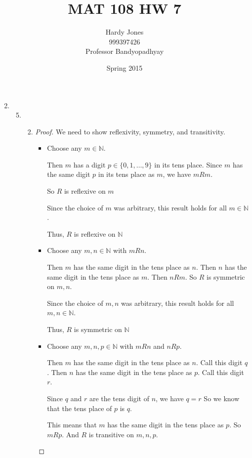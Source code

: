\documentclass[12pt,letterpaper]{article}
\title{MAT 108 HW 7\vspace{-2ex}}
\author{Hardy Jones\\
        999397426\\
        Professor Bandyopadhyay\vspace{-2ex}}
\date{Spring 2015}
\newcommand*\reflexive[4]{%
  Choose any $#3 \in \mathbb{#1}$.

  #4

  So $#2$ is reflexive on $#3$

  Since the choice of $#3$ was arbitrary,
  this result holds for all $#3 \in \mathbb{#1}$.

  Thus, $#2$ is reflexive on $\mathbb{#1}$
}
\begin{document}
  \maketitle

  \begin{enumerate}
    \setcounter{enumi}{1}
    \item
      \begin{enumerate}
        \setcounter{enumii}{4}
        \item
          \begin{enumerate}
            \setcounter{enumiii}{1}
            \item
              \begin{proof}
                We need to show reflexivity, symmetry, and transitivity.

                \begin{itemize}
                  \item
                    \reflexive{N}{R}{m}{
                      Then $m$ has a digit $p \in \{0, 1, \dots, 9\}$ in its tens place.
                      Since $m$ has the same digit $p$ in its tens place as $m$,
                      we have $m R m$.
                    }
                  \item
                    Choose any $m, n \in \mathbb{N}$ with $m R n$.

                    Then $m$ has the same digit in the tens place as $n$.
                    Then $n$ has the same digit in the tens place as $m$.
                    Then $n R m$.
                    So $R$ is symmetric on $m, n$.

                    Since the choice of $m, n$ was arbitrary,
                    this result holds for all $m, n \in \mathbb{N}$.

                    Thus, $R$ is symmetric on $\mathbb{N}$
                  \item
                    Choose any $m, n, p \in \mathbb{N}$ with $m R n$ and $n R p$.

                    Then $m$ has the same digit in the tens place as $n$.
                    Call this digit $q$.
                    Then $n$ has the same digit in the tens place as $p$.
                    Call this digit $r$.

                    Since $q$ and $r$ are the tens digit of $n$, we have $q = r$
                    So we know that the tens place of $p$ is $q$.

                    This means that $m$ has the same digit in the tens place as $p$.
                    So $m R p$.
                    And $R$ is transitive on $m, n, p$.


\end{itemize}
\end{proof}
\end{enumerate}
\end{enumerate}
\end{enumerate}
\end{document}
